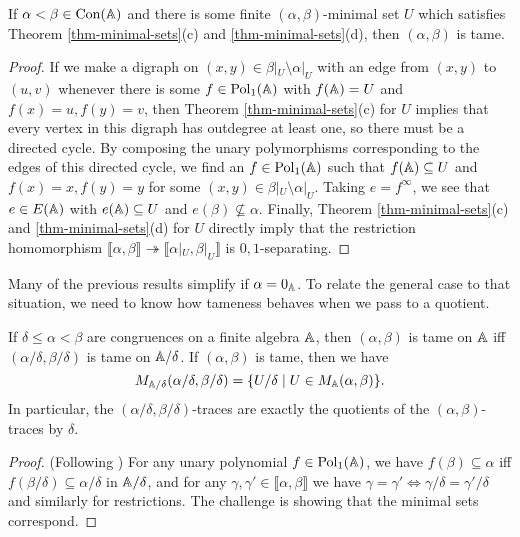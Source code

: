 \begin{appendices}
\begin{prop} If $\alpha < \beta \in \operatorname{Con}(\mathbb{A})$ and there is some finite $(\alpha,\beta)$-minimal set $U$ which satisfies Theorem \ref{thm-minimal-sets}(c) and \ref{thm-minimal-sets}(d), then $(\alpha,\beta)$ is tame.
\end{prop}
\begin{proof} If we make a digraph on $(x,y) \in \beta|_U\setminus\alpha|_U$ with an edge from $(x,y)$ to $(u,v)$ whenever there is some $f \in \operatorname{Pol}_1(\mathbb{A})$ with $f(\mathbb{A}) = U$ and $f(x) = u, f(y) = v$, then Theorem \ref{thm-minimal-sets}(c) for $U$ implies that every vertex in this digraph has outdegree at least one, so there must be a directed cycle. By composing the unary polymorphisms corresponding to the edges of this directed cycle, we find an $f \in \operatorname{Pol}_1(\mathbb{A})$ such that $f(\mathbb{A}) \subseteq U$ and $f(x) = x, f(y) = y$ for some $(x,y) \in \beta|_U\setminus\alpha|_U$. Taking $e = f^\infty$, we see that $e \in E(\mathbb{A})$ with $e(\mathbb{A}) \subseteq U$ and $e(\beta) \not\subseteq \alpha$. Finally, Theorem \ref{thm-minimal-sets}(c) and \ref{thm-minimal-sets}(d) for $U$ directly imply that the restriction homomorphism $\llbracket \alpha, \beta \rrbracket \twoheadrightarrow \llbracket \alpha|_U, \beta|_U \rrbracket$ is $0,1$-separating.
\end{proof}

Many of the previous results simplify if $\alpha = 0_{\mathbb{A}}$. To relate the general case to that situation, we need to know how tameness behaves when we pass to a quotient.

\begin{prop}\label{prop-tame-quotient} If $\delta \le \alpha < \beta$ are congruences on a finite algebra $\mathbb{A}$, then $(\alpha,\beta)$ is tame on $\mathbb{A}$ iff $(\alpha/\delta, \beta/\delta)$ is tame on $\mathbb{A}/\delta$. If $(\alpha,\beta)$ is tame, then we have
\[
M_{\mathbb{A}/\delta}(\alpha/\delta,\beta/\delta) = \{U/\delta \mid U \in M_{\mathbb{A}}(\alpha,\beta)\}.
\]
In particular, the $(\alpha/\delta,\beta/\delta)$-traces are exactly the quotients of the $(\alpha,\beta)$-traces by $\delta$.
\end{prop}
\begin{proof} (Following \cite{hobby-mckenzie}) For any unary polynomial $f \in \operatorname{Pol}_1(\mathbb{A})$, we have $f(\beta) \subseteq \alpha$ iff $f(\beta/\delta) \subseteq \alpha/\delta$ in $\mathbb{A}/\delta$, and for any $\gamma, \gamma' \in \llbracket \alpha, \beta \rrbracket$ we have $\gamma = \gamma' \iff \gamma/\delta = \gamma'/\delta$ and similarly for restrictions. The challenge is showing that the minimal sets correspond.%


\end{proof}
\end{appendices}
